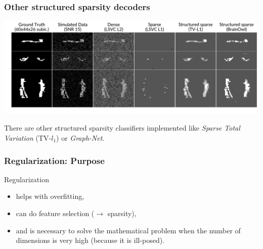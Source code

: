 \documentclass[11pt]{beamer}
\begin{document}
\appendix
\begin{frame}[t]
    \frametitle{Other structured sparsity decoders}
    
    \begin{center}
        \includegraphics[scale=0.35]{figures/template_and_weights_4_clfs.png}
    \end{center}

    There are other structured sparsity classifiers implemented like
    \emph{Sparse Total Variation} (TV-$l_1$) or
    \emph{Graph-Net}.


\end{frame}
\begin{frame}
  \frametitle{Regularization: Purpose}
  Regularization
  \begin{itemize}
  \item helps with overfitting,
  \item can do feature selection ($\rightarrow$ sparsity),
  \item and is necessary to solve the mathematical problem when the number of
    dimensions is very high (because it is ill-posed).
  \end{itemize}

\end{frame}
\end{document}
